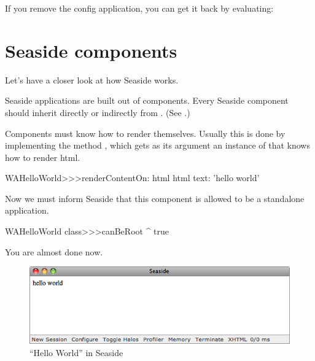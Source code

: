 \documentclass[a4paper,10pt,twoside]{book}
\begin{document}
If you remove the config application, you can get it back by evaluating:

\section{Seaside components}

Let's have a closer look at how Seaside works.

Seaside applications are built out of components.
Every Seaside component should inherit directly or indirectly from . (See .)


Components must know how to render themselves.
Usually this is done by implementing the method , which gets as its argument an instance of  that knows how to render html.

\begin{code}{}
WAHelloWorld>>>renderContentOn: html
	html text: 'hello world'
\end{code}

Now we must inform Seaside that this component is allowed to be a standalone application.


\begin{code}{}
WAHelloWorld class>>>canBeRoot
	^ true
\end{code}

You are almost done now.


\begin{figure}[ht]
\begin{center}
\includegraphics[width=\textwidth]{WAHelloWorld}
\caption{``Hello World'' in Seaside}
\label{fig:WAHelloWorld}
\end{center}
\end{figure}
\end{document}
